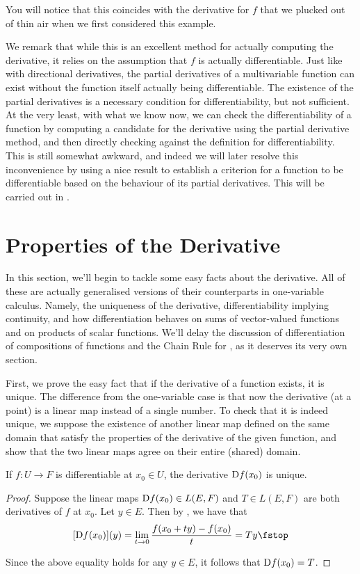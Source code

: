 You will notice that this coincides with the derivative for \( f \) that we plucked out of thin air when we first considered this example.

\vspace{3mm}

We remark that while this is an excellent method for actually computing the derivative, it relies on the assumption that \( f \) is actually differentiable. Just like with directional derivatives, the partial derivatives of a multivariable function can exist without the function itself actually being differentiable. The existence of the partial derivatives is a necessary condition for differentiability, but not sufficient. At the very least, with what we know now, we can check the differentiability of a function by computing a candidate for the derivative using the partial derivative method, and then directly checking against the definition for differentiability. This is still somewhat awkward, and indeed we will later resolve this inconvenience by using a nice result to establish a criterion for a function to be differentiable based on the behaviour of its partial derivatives. This will be carried out in .

\section{Properties of the Derivative}
In this section, we'll begin to tackle some easy facts about the derivative. All of these are actually generalised versions of their counterparts in one-variable calculus. Namely, the uniqueness of the derivative, differentiability implying continuity, and how differentiation behaves on sums of vector-valued functions and on products of scalar functions. We'll delay the discussion of differentiation of compositions of functions and the Chain Rule for , as it deserves its very own section.

\vspace{3mm}

First, we prove the easy fact that if the derivative of a function exists, it is unique. The difference from the one-variable case is that now the derivative (at a point) is a linear map instead of a single number. To check that it is indeed unique, we suppose the existence of another linear map defined on the same domain that satisfy the properties of the derivative of the given function, and show that the two linear maps agree on their entire (shared) domain.
\begin{proposition}
  If \( f:U\to F \) is differentiable at \( x_0\in U \), the derivative \( \text{D} f(x_0) \) is unique.
\end{proposition}
\begin{proof}
  Suppose the linear maps \( \text{D} f(x_0)\in L(E,F) \) and \( T\in L(E,F) \) are both derivatives of \( f \) at \( x_0 \). Let \( y\in E \). Then by , we have that
  \[ [\D f(x_0)](y)=\lim_{t\to 0}\frac{f(x_0+ty)-f(x_0)}{t}=Ty\fstop \]

  Since the above equality holds for any \( y\in E \), it follows that \( \text{D} f(x_0)=T \).
\end{proof}

